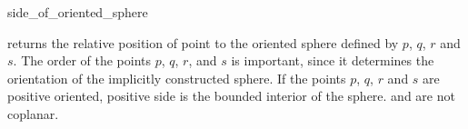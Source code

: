 \begin{ccRefFunction}{side_of_oriented_sphere}

         {returns the relative position of point 
          to the oriented sphere defined by $p$, $q$, $r$ and $s$.
          The order of the points $p$, $q$, $r$, and $s$ is important,
          since it determines the orientation of the implicitly
          constructed sphere. If the points $p$, $q$, $r$ and $s$
          are positive oriented, positive side is the bounded interior
          of the sphere.
          \ccPrecond {} and  are not coplanar.}

\ccSeeAlso

 \\

\end{ccRefFunction}

